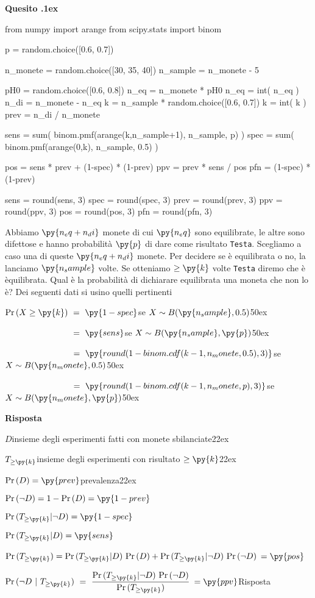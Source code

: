 \documentclass[11pt,twoside,a4paper]{article}
\def\Pr{{\rm Pr\,}}
\newcounter{quesito}
\newenvironment{question}{\bigskip\addtocounter{quesito}{1}\par\textbf{Quesito \thequesito.\kern1ex}}{\vspace{\parskip}}
\newenvironment{answer}{\par\textbf{Risposta\quad}}{\vspace{\parskip}}
\begin{document}
\begin{question}
\def\Pr{{\rm Pr\,}}
\begin{pycode}
from numpy import arange
from scipy.stats import binom

p = random.choice([0.6, 0.7])

n_monete = random.choice([30, 35, 40])
n_sample = n_monete - 5

pH0 = random.choice([0.6, 0.8])
n_eq = n_monete * pH0
n_eq = int( n_eq )
n_di = n_monete - n_eq
k = n_sample * random.choice([0.6, 0.7])
k = int( k )
prev = n_di / n_monete


sens = sum( binom.pmf(arange(k,n_sample+1), n_sample, p) )
spec = sum( binom.pmf(arange(0,k), n_sample, 0.5) )

pos =  sens * prev + (1-spec) * (1-prev)
ppv =  prev * sens  / pos
pfn =  (1-spec) * (1-prev) 

sens = round(sens, 3)
spec = round(spec, 3)
prev = round(prev, 3)
ppv = round(ppv, 3)
pos = round(pos, 3)
pfn = round(pfn, 3)
\end{pycode}
Abbiamo $\py{n_eq+n_di}$ monete di cui $\py{n_eq}$ sono equilibrate, le altre sono difettose e hanno probabilità $\py{p}$ di dare come risultato {\tt Testa}. Scegliamo a caso una di queste $\py{n_eq+n_di}$ monete. Per decidere se è equilibrata o no, la lanciamo $\py{n_sample}$ volte. Se otteniamo $\ge\py{k}$ volte {\tt Testa\/} diremo che è èquilibrata. Qual è la probabilità di dichiarare equilibrata una moneta che non lo è? Dei seguenti dati si usino quelli pertinenti


$\Pr(X\ge \py{k})\ =\ \py{1-spec}$\hfill se $X\sim B(\py{n_sample},0.5)$\kern50ex

$\phantom{\Pr(X\ge \py{k})}\ =\ \py{sens}$\hfill se $X\sim B(\py{n_sample},\py{p})$\kern50ex

$\phantom{\Pr(X\ge \py{k})}\ =\ \py{round(1-binom.cdf(k-1, n_monete,0.5), 3)}$\hfill se $X\sim B(\py{n_monete},0.5)$\kern50ex

$\phantom{\Pr(X\ge \py{k})}\ =\ \py{round(1-binom.cdf(k-1, n_monete,  p), 3)}$\hfill se $X\sim B(\py{n_monete},\py{p})$\kern50ex


\begin{answer}

$D$\hfill insieme degli esperimenti fatti con monete sbilanciate\kern22ex

$T_{\ge\py{k}}$\hfill insieme degli esperimenti con risultato $\ge\py{k}$\kern22ex

$\Pr(D)=\py{prev}$\hfill prevalenza\kern22ex

$\Pr(\neg D)=1-\Pr(D)=\py{1-prev}$

$\Pr(T_{\ge\py{k}}| \neg D)=\py{1-spec}$

$\Pr(T_{\ge\py{k}}| D)=\py{sens}$

$\Pr(T_{\ge\py{k}})=\Pr(T_{\ge\py{k}}|D)\ \Pr(D) + \Pr(T_{\ge\py{k}}|\neg D)\ \Pr(\neg D)$ {\color{blue} $=\py{pos}$}

$\displaystyle\Pr(\neg D ~|~T_{\ge\py{k}})\ =\ \frac{\Pr(T_{\ge\py{k}}|\neg D)\ \Pr(\neg D)}{\Pr(T_{\ge\py{k}})}$ {\color{blue} $=\py{ppv}$\hfill Risposta}

\end{answer}
\end{question}
\end{document}
